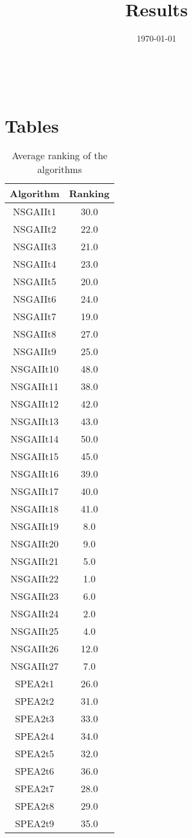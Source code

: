 \documentclass{article}
\title{Results}
\author{}
\date{\today}
\begin{document}
\oddsidemargin 0in \topmargin 0in\maketitle
\
\section{Tables}
\begin{table}[!htp]
\centering
\caption{Average ranking of the algorithms}
\begin{tabular}{c|c}
Algorithm&Ranking\\
\hline
NSGAIIt1&30.0\\
NSGAIIt2&22.0\\
NSGAIIt3&21.0\\
NSGAIIt4&23.0\\
NSGAIIt5&20.0\\
NSGAIIt6&24.0\\
NSGAIIt7&19.0\\
NSGAIIt8&27.0\\
NSGAIIt9&25.0\\
NSGAIIt10&48.0\\
NSGAIIt11&38.0\\
NSGAIIt12&42.0\\
NSGAIIt13&43.0\\
NSGAIIt14&50.0\\
NSGAIIt15&45.0\\
NSGAIIt16&39.0\\
NSGAIIt17&40.0\\
NSGAIIt18&41.0\\
NSGAIIt19&8.0\\
NSGAIIt20&9.0\\
NSGAIIt21&5.0\\
NSGAIIt22&1.0\\
NSGAIIt23&6.0\\
NSGAIIt24&2.0\\
NSGAIIt25&4.0\\
NSGAIIt26&12.0\\
NSGAIIt27&7.0\\
SPEA2t1&26.0\\
SPEA2t2&31.0\\
SPEA2t3&33.0\\
SPEA2t4&34.0\\
SPEA2t5&32.0\\
SPEA2t6&36.0\\
SPEA2t7&28.0\\
SPEA2t8&29.0\\
SPEA2t9&35.0\\

\end{tabular}
\end{table}
\end{document}
